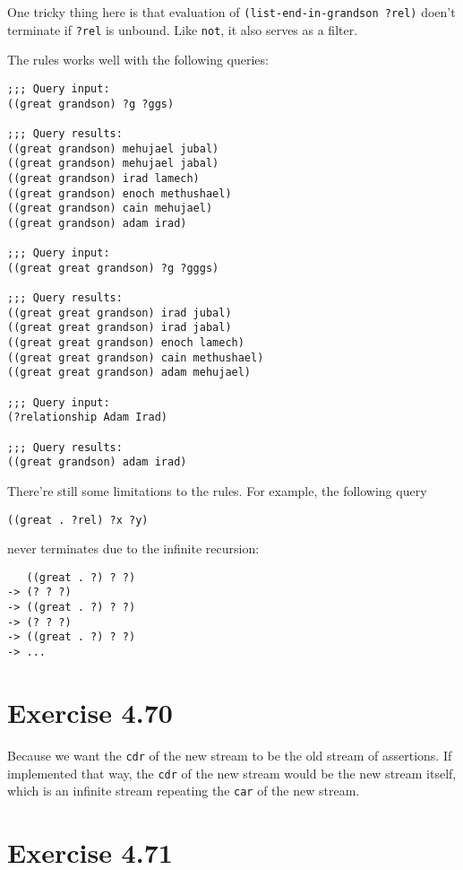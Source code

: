 \documentclass[../main.tex]{subfiles}
\begin{document}
One tricky thing here is that evaluation of \lstinline{(list-end-in-grandson ?rel)} doen't terminate if \lstinline{?rel} is unbound. Like \lstinline{not}, it also serves as a filter.

The rules works well with the following queries:

\begin{lstlisting}
;;; Query input:
((great grandson) ?g ?ggs)

;;; Query results:
((great grandson) mehujael jubal)
((great grandson) mehujael jabal)
((great grandson) irad lamech)
((great grandson) enoch methushael)
((great grandson) cain mehujael)
((great grandson) adam irad)

;;; Query input:
((great great grandson) ?g ?gggs)

;;; Query results:
((great great grandson) irad jubal)
((great great grandson) irad jabal)
((great great grandson) enoch lamech)
((great great grandson) cain methushael)
((great great grandson) adam mehujael)

;;; Query input:
(?relationship Adam Irad)

;;; Query results:
((great grandson) adam irad)
\end{lstlisting}

There're still some limitations to the rules. For example, the following query

\begin{lstlisting}
((great . ?rel) ?x ?y)
\end{lstlisting}

never terminates due to the infinite recursion:

\begin{lstlisting}
   ((great . ?) ? ?)
-> (? ? ?)
-> ((great . ?) ? ?)
-> (? ? ?)
-> ((great . ?) ? ?)
-> ...
\end{lstlisting}

\section{Exercise 4.70}

Because we want the \lstinline{cdr} of the new stream to be the old stream of assertions. If implemented that way, the \lstinline{cdr} of the new stream would be the new stream itself, which is an infinite stream repeating the \lstinline{car} of the new stream.

\section{Exercise 4.71}
\end{document}
